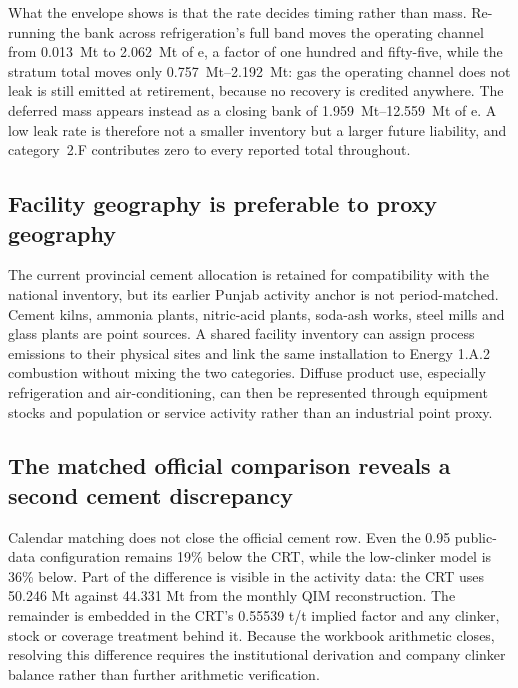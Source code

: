 What the envelope shows is that the rate decides timing rather than mass. Re-running the
bank across refrigeration's full band moves the operating channel from
\SI{0.013}{\mega\tonne} to \SI{2.062}{\mega\tonne} of \COtwo e, a factor of
one hundred and fifty-five, while the stratum total moves only
\SIrange{0.757}{2.192}{\mega\tonne}: gas the operating channel does not leak is still
emitted at retirement, because no recovery is credited anywhere. The deferred mass appears
instead as a closing bank of \SIrange{1.959}{12.559}{\mega\tonne} of \COtwo e. A low
leak rate is therefore not a smaller inventory but a larger future liability, and
category~2.F contributes zero to every reported total throughout.

\subsection{Facility geography is preferable to proxy geography}

The current provincial cement allocation is retained for compatibility with the national
inventory, but its earlier Punjab activity anchor is not period-matched. Cement kilns,
ammonia plants, nitric-acid plants, soda-ash works, steel mills and glass plants are point
sources. A shared facility inventory can assign process emissions to their physical sites and
link the same installation to Energy 1.A.2 combustion without mixing the two categories.
Diffuse product use, especially refrigeration and air-conditioning, can then be represented
through equipment stocks and population or service activity rather than an industrial point
proxy.

\subsection{The matched official comparison reveals a second cement discrepancy}

Calendar matching does not close the official cement row. Even the 0.95 public-data
configuration remains 19\% below the CRT, while the low-clinker model is 36\% below. Part of
the difference is visible in the activity data: the CRT uses 50.246 Mt against 44.331 Mt from
the monthly QIM reconstruction. The remainder is embedded in the CRT's 0.55539 t/t implied
factor and any clinker, stock or coverage treatment behind it. Because the workbook arithmetic
closes, resolving this difference requires the institutional derivation and company clinker
balance rather than further arithmetic verification.

